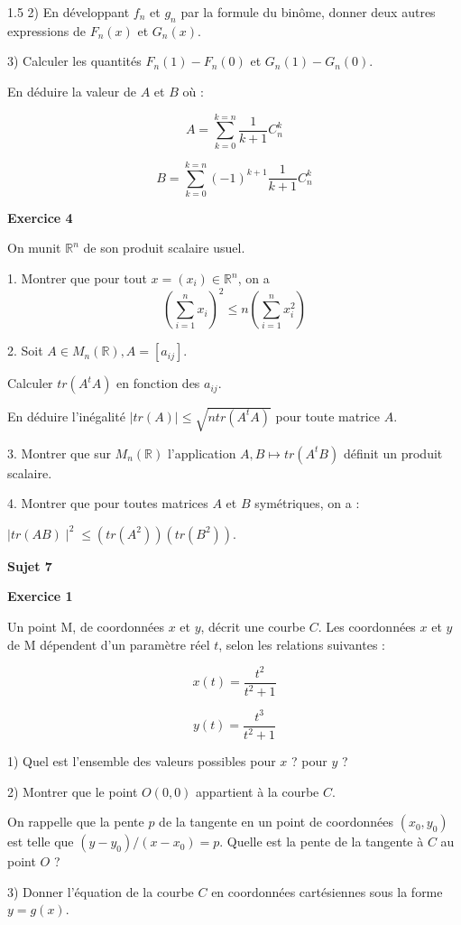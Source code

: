 \documentclass[12pt]{article}
\begin{document}
\begin{spacing}{1.5}
2) En développant $f_n$ et $g_n$ par la formule du binôme, donner deux autres expressions de $F_n(x)$ et $G_n(x)$. 

3) Calculer les quantités $F_n(1)-F_n(0)$ et $G_n(1) - G_n(0)$. 

En déduire la valeur de $A$ et $B$ où : 

\[
A = \sum_{k=0}^{k=n}\frac{1}{k+1}C_{n}^{k}
\]

\[
B=\sum_{k=0}^{k=n}(-1)^{k+1}\frac{1}{k+1}C_{n}^{k}
\]

\medskip\textbf{Exercice 4}

 On munit $\mathbb{R}^n$ de son produit scalaire usuel.
 
 1. Montrer que pour tout $x = (x_i) \in \mathbb{R}^n$, on a
 \[
 (\sum_{i=1}^{n} x_i)^2\leq n(\sum_{i=1}^{n} x_{i}^{2})
 \]
 
 2.  Soit $A \in M_{n}(\mathbb{R}), A = [a_{ij}]$.
 
 Calculer $tr(A^tA)$ en fonction des $a_{ij}$.
 
 En déduire l'inégalité $\mid tr(A)\mid \leq \sqrt{ntr(A^tA)}$ pour toute matrice $A$.
 
 3. Montrer que sur $M_n(\mathbb{R})$ l'application $A,B \longmapsto tr(A^tB)$ définit un produit scalaire.
 
4. Montrer que pour toutes matrices $A$ et $B$ symétriques, on a :
 
 $\mid tr(AB)\mid^2 \leq  (tr(A^2))(tr(B^2))$.
 
 \quad
 
 \medskip\textbf{Sujet 7}
 
 \medskip\textbf{Exercice 1}

Un point M, de coordonnées $x$ et $y$, décrit une courbe $C$. Les coordonnées $x$ et $y$ de M 
dépendent d'un paramètre réel $t$, selon les relations suivantes : 


\[x(t) =\frac{t^2}{t^2+1}\]

\[y(t) =\frac{t^3}{t^2+1}
\]

1) Quel est l'ensemble des valeurs possibles pour $x$ ? pour $y$ ? 

2) Montrer que le point $O(0,0)$ appartient à la courbe $C$.  

On rappelle que la pente $p$ de la tangente en un point de coordonnées $(x_0,y_0)$ est telle que 
$(y - y_0)/(x - x_0) = p$. Quelle est la pente de la tangente à $C$ au point $O$ ? 

3) Donner l'équation de la courbe $C$ en coordonnées cartésiennes sous la forme $y = g(x)$. 


\end{spacing}
\end{document}

